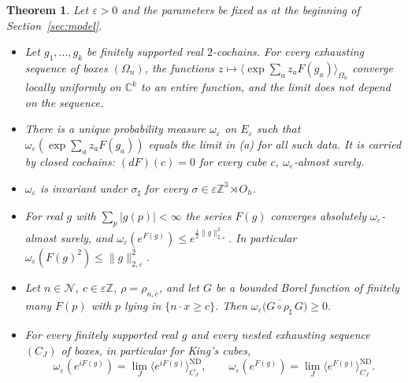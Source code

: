 \documentclass[11pt]{amsart}
\theoremstyle{plain}
\newtheorem{theorem}{Theorem}[section]
\theoremstyle{definition}
\theoremstyle{remark}
\numberwithin{equation}{section}
\newcommand{\Z}{\mathbb{Z}}
\newcommand{\C}{\mathbb{C}}
\newcommand{\eps}{\varepsilon}
\newcommand{\cN}{\mathcal{N}}
\newcommand{\Oh}{O_h}
\newcommand{\abs}[1]{\lvert #1\rvert}
\newcommand{\norm}[1]{\lVert #1\rVert}
\newcommand{\ev}[1]{\langle #1\rangle}
\begin{document}
\begin{theorem}\label{thm:infvol}
Let $\eps>0$ and the parameters be fixed as at the beginning of Section~\ref{sec:model}.
\begin{itemize}
\item[(a)] Let $g_1,\dots,g_k$ be finitely supported real $2$-cochains. For every exhausting sequence of boxes $(\Omega_n)$, the functions $z\mapsto\ev{\exp\sum_az_aF(g_a)}_{\Omega_n}$ converge locally uniformly on $\C^k$ to an entire function, and the limit does not depend on the sequence.
\item[(b)] There is a unique probability measure $\omega_\eps$ on $E_\eps$ such that $\omega_\eps(\exp\sum_az_aF(g_a))$ equals the limit in (a) for all such data. It is carried by closed cochains: $(dF)(c)=0$ for every cube $c$, $\omega_\eps$-almost surely.
\item[(c)] $\omega_\eps$ is invariant under $\sigma_\sharp$ for every $\sigma\in\eps\Z^3\rtimes\Oh$.
\item[(d)] For real $g$ with $\sum_p\abs{g(p)}<\infty$ the series $F(g)$ converges absolutely $\omega_\eps$-almost surely, and $\omega_\eps(e^{F(g)})\le e^{\frac12\norm g_{2,\eps}^2}$. In particular $\omega_\eps(F(g)^2)\le\norm g_{2,\eps}^2$.
\item[(e)] Let $n\in\cN$, $c\in\eps\Z$, $\rho=\rho_{n,c}$, and let $G$ be a bounded Borel function of finitely many $F(p)$ with $p$ lying in $\{n\cdot x\ge c\}$. Then $\omega_\eps\big(\overline{G\circ\rho_\sharp}\,G\big)\ge0$.
\item[(f)] For every finitely supported real $g$ and every nested exhausting sequence $(C_J)$ of boxes, in particular for King's cubes,
\[
\omega_\eps(e^{iF(g)})=\lim_J\ev{e^{iF(g)}}^{\mathrm{ND}}_{C_J},\qquad\omega_\eps(e^{F(g)})=\lim_J\ev{e^{F(g)}}^{\mathrm{ND}}_{C_J}.
\]
\end{itemize}
\end{theorem}
\end{document}
